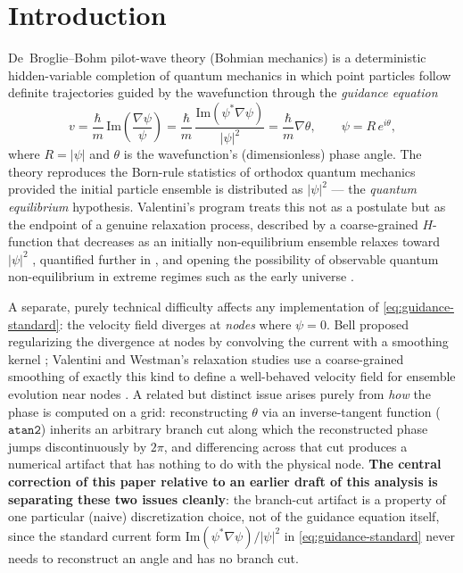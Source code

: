 \documentclass[11pt]{article}
\begin{document}
\section{Introduction}

De~Broglie--Bohm pilot-wave theory (Bohmian mechanics) is a deterministic hidden-variable completion of quantum mechanics in which point particles follow definite trajectories guided by the wavefunction through the \emph{guidance equation}
\begin{equation}
v = \frac{\hbar}{m}\,\mathrm{Im}\!\left(\frac{\nabla\psi}{\psi}\right) = \frac{\hbar}{m}\,\frac{\mathrm{Im}(\psi^*\nabla\psi)}{|\psi|^2} = \frac{\hbar}{m}\nabla \theta,
\qquad \psi = R\,e^{i\theta},
\label{eq:guidance-standard}
\end{equation}
where $R=|\psi|$ and $\theta$ is the wavefunction's (dimensionless) phase angle. The theory reproduces the Born-rule statistics of orthodox quantum mechanics provided the initial particle ensemble is distributed as $|\psi|^2$ — the \emph{quantum equilibrium} hypothesis. Valentini's program treats this not as a postulate but as the endpoint of a genuine relaxation process, described by a coarse-grained $H$-function that decreases as an initially non-equilibrium ensemble relaxes toward $|\psi|^2$ \cite{valentini2005dynamical}, quantified further in \cite{towler2011relaxation}, and opening the possibility of observable quantum non-equilibrium in extreme regimes such as the early universe \cite{valentini2024search}.

A separate, purely technical difficulty affects any implementation of \eqref{eq:guidance-standard}: the velocity field diverges at \emph{nodes} where $\psi=0$. Bell proposed regularizing the divergence at nodes by convolving the current with a smoothing kernel \cite{bell1987}; Valentini and Westman's relaxation studies use a coarse-grained smoothing of exactly this kind to define a well-behaved velocity field for ensemble evolution near nodes \cite{valentini2005dynamical}. A related but distinct issue arises purely from \emph{how} the phase is computed on a grid: reconstructing $\theta$ via an inverse-tangent function ($\mathtt{atan2}$) inherits an arbitrary branch cut along which the reconstructed phase jumps discontinuously by $2\pi$, and differencing across that cut produces a numerical artifact that has nothing to do with the physical node. \textbf{The central correction of this paper relative to an earlier draft of this analysis is separating these two issues cleanly}: the branch-cut artifact is a property of one particular (naive) discretization choice, not of the guidance equation itself, since the standard current form $\mathrm{Im}(\psi^*\nabla\psi)/|\psi|^2$ in \eqref{eq:guidance-standard} never needs to reconstruct an angle and has no branch cut.
\end{document}
